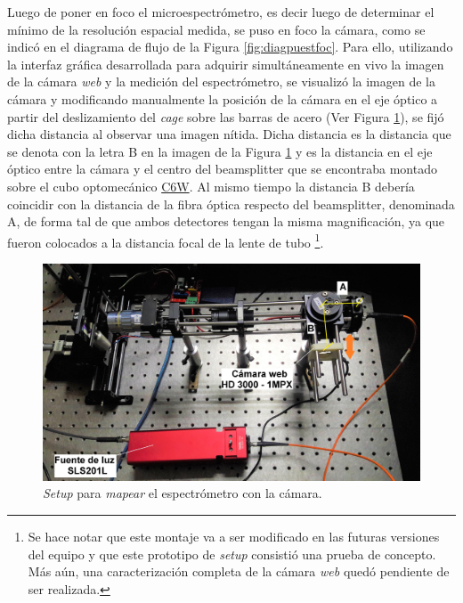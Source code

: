 \hspace{0.5cm}Luego de poner en foco el microespectrómetro, es decir luego de determinar el mínimo de la resolución espacial medida, se puso en foco la cámara, como se indicó en el diagrama de flujo de la Figura \ref{fig:diagpuestfoc}. Para ello, utilizando la interfaz gráfica desarrollada para adquirir simultáneamente en vivo la imagen de la cámara \textit{web} y la medición del espectrómetro, se visualizó la imagen de la cámara y modificando manualmente la posición de la cámara en el eje óptico a partir del deslizamiento del \textit{cage} sobre las barras de acero (Ver Figura \ref{fig:modmanualcam}), se fijó dicha distancia al observar una imagen nítida. Dicha distancia es la distancia que se denota con la letra B en la imagen de  la Figura \ref{fig:modmanualcam} y es la distancia en el eje óptico entre la cámara y el centro del beamsplitter que se encontraba montado sobre el cubo optomecánico \href{https://www.thorlabs.com/thorproduct.cfm?partnumber=C6W}{C6W}. Al mismo tiempo la distancia B debería coincidir con la distancia de la fibra óptica respecto del beamsplitter, denominada A, de forma tal de que ambos detectores tengan la misma magnificación, ya que fueron colocados a la distancia focal de la lente de tubo \footnote{Se hace notar que este montaje va a ser modificado en las futuras versiones del equipo y que este prototipo de \textit{setup} consistió una prueba de concepto. Más aún, una caracterización completa de la cámara \textit{web} quedó pendiente de ser realizada.}.  

\begin{figure}[H]
	\centering
	\includegraphics[width=1.0\textwidth]{Figs/microespectrometro/mapespeccam.jpg}
	\caption{\textit{Setup} para \textit{mapear} el espectrómetro con la cámara.}
	\label{fig:modmanualcam}
\end{figure}

